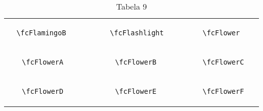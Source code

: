 \documentclass[x11names]{article}
\begin{document}
\begin{table}[H]
\begin{tabular}{|c|c|c|c|c|c|}
		&\multirow{5}{*}{	\fcFlamingoB	[scale=0.8]} & &\multirow{5}{*}{	\fcFlashlight	[scale=0.3]} & &\multirow{5}{*}{	\fcFlower	[scale=0.4]}\\	& & & & & \\	& & & & & \\	\verb|	\fcFlamingoB	| & & \verb|	\fcFlashlight	| & & \verb|	\fcFlower	| & \\	& & & & & \\	& & & & & \\	& & & & & \\	\hline									
		&\multirow{5}{*}{	\fcFlowerA	[scale=0.8]} & &\multirow{5}{*}{	\fcFlowerB	[scale=0.6]} & &\multirow{5}{*}{	\fcFlowerC	[scale=0.6]}\\	& & & & & \\	& & & & & \\	\verb|	\fcFlowerA	| & & \verb|	\fcFlowerB	| & & \verb|	\fcFlowerC	| & \\	& & & & & \\	& & & & & \\	& & & & & \\	\hline									
		&\multirow{5}{*}{	\fcFlowerD	[scale=0.8]} & &\multirow{5}{*}{	\fcFlowerE	[scale=0.3]} & &\multirow{5}{*}{	\fcFlowerF	[scale=0.8]}\\	& & & & & \\	& & & & & \\	\verb|	\fcFlowerD	| & & \verb|	\fcFlowerE	| & & \verb|	\fcFlowerF	| & \\	& & & & & \\	& & & & & \\	& & & & & \\		\hline 	\hline 	\end{tabular}	\caption{	Tabela 9	}\label{	Tab9	}\end{table}
\end{document}
